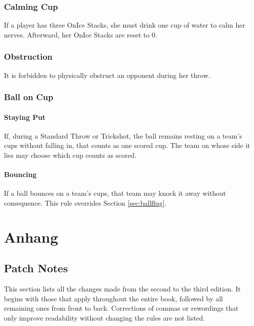\documentclass[a5paper, 12pt]{book}
\begin{document}
\section{Calming Cup}\label{sec:nervenbecher}
If a player has three OnIce Stacks, she must drink one cup of water to calm her nerves.  
Afterward, her OnIce Stacks are reset to 0.

\section{Obstruction}\label{sec:behinderung}
It is forbidden to physically obstruct an opponent during her throw.

\section{Ball on Cup}\label{sec:ballaufbecher}

\subsection{Staying Put}\label{sec:ballaufbecher_liegen}
If, during a Standard Throw or Trickshot, the ball remains resting on a team’s cups without falling in, that counts as one scored cup.  
The team on whose side it lies may choose which cup counts as scored.

\subsection{Bouncing}\label{sec:ballaufbecher_springen}
If a ball bounces on a team’s cups, that team may knock it away without consequence.  
This rule overrides Section \ref{sec:ballflug}.

\appendix
\part {Anhang} \label{part:anhang}
\chapter{Patch Notes}\label{chap:patchnotes}
This section lists all the changes made from the second to the third edition.  
It begins with those that apply throughout the entire book, followed by all remaining ones from front to back.  
Corrections of commas or rewordings that only improve readability without changing the rules are not listed.
\end{document}
